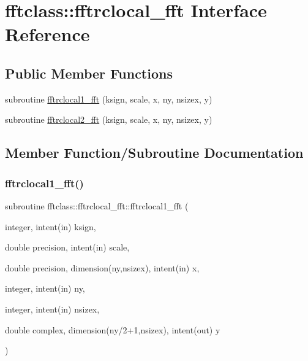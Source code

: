 \hypertarget{interfacefftclass_1_1fftrclocal__fft}{}\section{fftclass\+::fftrclocal\+\_\+fft Interface Reference}
\label{interfacefftclass_1_1fftrclocal__fft}
\subsection*{Public Member Functions}
\begin{DoxyCompactItemize}
\item 
subroutine \mbox{\hyperlink{interfacefftclass_1_1fftrclocal__fft_ad2f8e56358bf7655e35fac599301601a}{fftrclocal1\+\_\+fft}} (ksign, scale, x, ny, nsizex, y)
\item 
subroutine \mbox{\hyperlink{interfacefftclass_1_1fftrclocal__fft_ab6b99a37c96bc0208402cced3fc85b5f}{fftrclocal2\+\_\+fft}} (ksign, scale, x, ny, nsizex, y)
\end{DoxyCompactItemize}


\subsection{Member Function/\+Subroutine Documentation}
\mbox{\label{interfacefftclass_1_1fftrclocal__fft_ad2f8e56358bf7655e35fac599301601a}} 
\subsubsection{\texorpdfstring{fftrclocal1\_fft()}{fftrclocal1\_fft()}}
{\footnotesize\ttfamily subroutine fftclass\+::fftrclocal\+\_\+fft\+::fftrclocal1\+\_\+fft (\begin{DoxyParamCaption}\item[{integer, intent(in)}]{ksign,  }\item[{double precision, intent(in)}]{scale,  }\item[{double precision, dimension(ny,nsizex), intent(in)}]{x,  }\item[{integer, intent(in)}]{ny,  }\item[{integer, intent(in)}]{nsizex,  }\item[{double complex, dimension(ny/2+1,nsizex), intent(out)}]{y }\end{DoxyParamCaption})}

